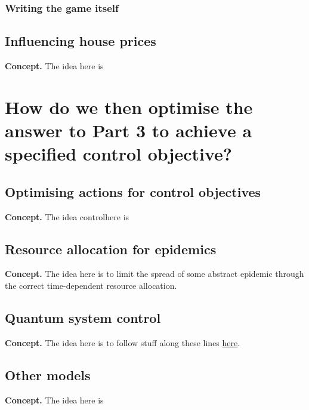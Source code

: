 \documentclass{book}
\begin{document}
\section{\sffamily Writing the game itself}

\chapter{\sffamily Influencing house prices}

{\bfseries\sffamily Concept.} The idea here is 


\part*{{ How do we then optimise the answer to Part 3 to achieve a specified control objective?}}


\chapter{\sffamily Optimising actions for control objectives}

{\bfseries\sffamily Concept.} The idea  controlhere is 


\chapter{\sffamily Resource allocation for epidemics}

{\bfseries\sffamily Concept.} The idea here is to limit the spread of some abstract epidemic through the correct time-dependent resource allocation.


\chapter{\sffamily Quantum system control}

{\bfseries\sffamily Concept.} The idea here is to follow stuff along these lines \href{https://arxiv.org/pdf/1210.7127.pdf}{here}.


\chapter{\sffamily Other models}

{\bfseries\sffamily Concept.} The idea here is




\backmatter


\end{document}
